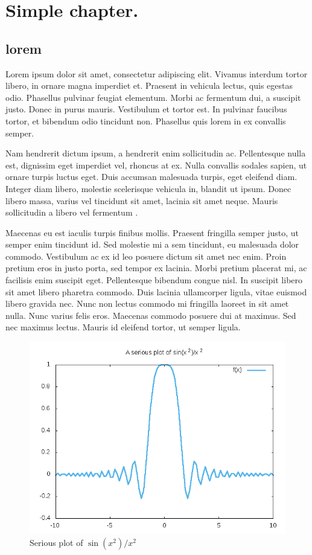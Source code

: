 \section{\label{conclusions}Simple chapter.}

\subsection{lorem}
Lorem ipsum dolor sit amet, consectetur adipiscing elit. Vivamus interdum tortor libero, in ornare magna imperdiet et. Praesent in vehicula lectus, quis egestas odio. Phasellus pulvinar feugiat elementum. Morbi ac fermentum dui, a suscipit justo. Donec in purus mauris. Vestibulum et tortor est. In pulvinar faucibus tortor, et bibendum odio tincidunt non. Phasellus quis lorem in ex convallis semper.

Nam hendrerit dictum ipsum, a hendrerit enim sollicitudin ac. Pellentesque nulla est, dignissim eget imperdiet vel, rhoncus at ex. Nulla convallis sodales sapien, ut ornare turpis luctus eget. Duis accumsan malesuada turpis, eget eleifend diam. Integer diam libero, molestie scelerisque vehicula in, blandit ut ipsum. Donec libero massa, varius vel tincidunt sit amet, lacinia sit amet neque. Mauris sollicitudin a libero vel fermentum \cite{Bizzarri2013}.

Maecenas eu est iaculis turpis finibus mollis. Praesent fringilla semper justo, ut semper enim tincidunt id. Sed molestie mi a sem tincidunt, eu malesuada dolor commodo. Vestibulum ac ex id leo posuere dictum sit amet nec enim. Proin pretium eros in justo porta, sed tempor ex lacinia. Morbi pretium placerat mi, ac facilisis enim suscipit eget. Pellentesque bibendum congue nisl. In suscipit libero sit amet libero pharetra commodo. Duis lacinia ullamcorper ligula, vitae euismod libero gravida nec. Nunc non lectus commodo mi fringilla laoreet in sit amet nulla. Nunc varius felis eros. Maecenas commodo posuere dui at maximus. Sed nec maximus lectus. Mauris id eleifend tortor, ut semper ligula.

\begin{figure}[ht]
  \centering
  \includegraphics{figures/figure-1}
  \caption{Serious plot of $\sin\left( x^{2} \right)/x^{2}$}
  \label{fig:fig1}
\end{figure}

